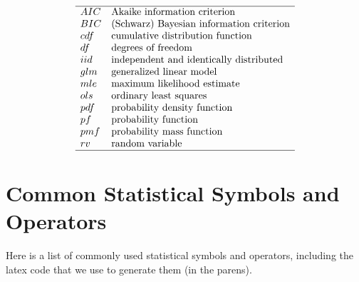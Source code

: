 \documentclass[]{book}
\theoremstyle{definition}
\theoremstyle{definition}
\theoremstyle{definition}
\theoremstyle{remark}
\begin{document}
\[
\begin{array}{ll}
\hline
AIC & \text{Akaike information criterion} \\
BIC & \text{(Schwarz) Bayesian information criterion} \\
cdf & \text{cumulative distribution function} \\
df & \text{degrees of freedom} \\
iid & \text{independent and identically distributed} \\
glm & \text{generalized linear model} \\
mle & \text{maximum likelihood estimate}\\
ols & \text{ordinary least squares} \\
pdf & \text{probability density function} \\
pf  & \text{probability  function} \\
pmf & \text{probability mass function} \\
rv & \text{random variable} \\ \hline
\end{array}
\]

\section{Common Statistical Symbols and Operators}\label{S:StatSymbols}

Here is a list of commonly used statistical symbols and operators,
including the latex code that we use to generate them (in the parens).
\end{document}
